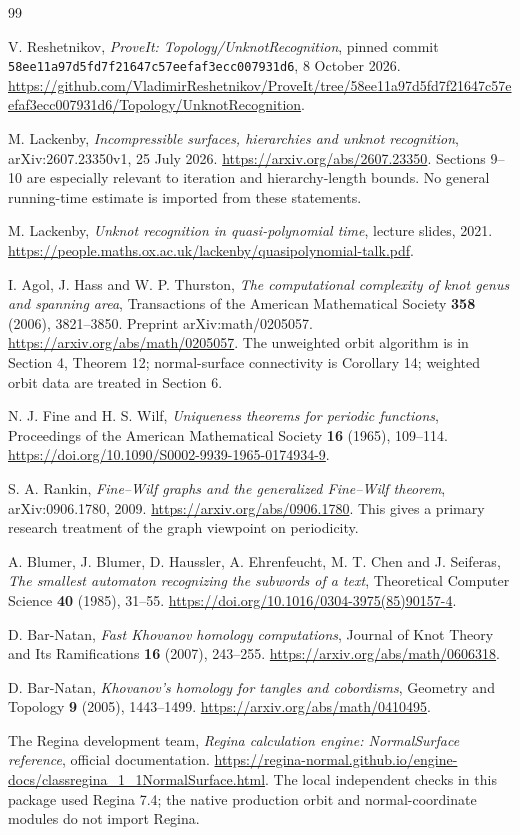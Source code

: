\begin{thebibliography}{99}
\raggedright
{}
V. Reshetnikov, \emph{ProveIt: Topology/UnknotRecognition},
pinned commit \texttt{58ee11a97d5fd7f21647c57eefaf3ecc007931d6},
8 October 2026.
\url{https://github.com/VladimirReshetnikov/ProveIt/tree/58ee11a97d5fd7f21647c57eefaf3ecc007931d6/Topology/UnknotRecognition}.

M. Lackenby, \emph{Incompressible surfaces, hierarchies and unknot
recognition}, arXiv:2607.23350v1, 25 July 2026.
\url{https://arxiv.org/abs/2607.23350}.
Sections 9--10 are especially relevant to iteration and hierarchy-length
bounds. No general running-time estimate is imported from these statements.

M. Lackenby, \emph{Unknot recognition in quasi-polynomial time},
lecture slides, 2021.
\url{https://people.maths.ox.ac.uk/lackenby/quasipolynomial-talk.pdf}.

I. Agol, J. Hass and W. P. Thurston,
\emph{The computational complexity of knot genus and spanning area},
Transactions of the American Mathematical Society \textbf{358} (2006),
3821--3850. Preprint arXiv:math/0205057.
\url{https://arxiv.org/abs/math/0205057}.
The unweighted orbit algorithm is in Section 4, Theorem 12;
normal-surface connectivity is Corollary 14; weighted orbit data are
treated in Section 6.

N. J. Fine and H. S. Wilf, \emph{Uniqueness theorems for periodic
functions}, Proceedings of the American Mathematical Society
\textbf{16} (1965), 109--114.
\url{https://doi.org/10.1090/S0002-9939-1965-0174934-9}.

S. A. Rankin, \emph{Fine--Wilf graphs and the generalized Fine--Wilf
theorem}, arXiv:0906.1780, 2009.
\url{https://arxiv.org/abs/0906.1780}.
This gives a primary research treatment of the graph viewpoint on
periodicity.

A. Blumer, J. Blumer, D. Haussler, A. Ehrenfeucht, M. T. Chen and
J. Seiferas, \emph{The smallest automaton recognizing the subwords
of a text}, Theoretical Computer Science \textbf{40} (1985), 31--55.
\url{https://doi.org/10.1016/0304-3975(85)90157-4}.

D. Bar-Natan, \emph{Fast Khovanov homology computations},
Journal of Knot Theory and Its Ramifications \textbf{16} (2007),
243--255. \url{https://arxiv.org/abs/math/0606318}.

D. Bar-Natan, \emph{Khovanov's homology for tangles and cobordisms},
Geometry and Topology \textbf{9} (2005), 1443--1499.
\url{https://arxiv.org/abs/math/0410495}.

The Regina development team, \emph{Regina calculation engine:
NormalSurface reference}, official documentation.
\url{https://regina-normal.github.io/engine-docs/classregina_1_1NormalSurface.html}.
The local independent checks in this package used Regina 7.4;
the native production orbit and normal-coordinate modules do not
import Regina.
\end{thebibliography}
